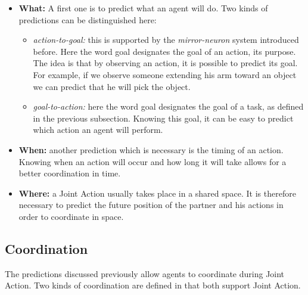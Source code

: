 \documentclass[english,a4paper,11pt,twoside]{StyleThese}
\begin{document}
\begin{itemize}
\item \textbf{What:} A first one is to predict what an agent will do. Two kinds of predictions can be distinguished here:
\begin{itemize}
\item \textit{action-to-goal:} this is supported by the \textit{mirror-neuron} system introduced before. Here the word goal designates the goal of an action, its purpose. The idea is that by observing an action, it is possible to predict its goal. For example, if we observe someone extending his arm toward an object we can predict that he will pick the object.
\item \textit{goal-to-action:} here the word goal designates the goal of a task, as defined in the previous subsection. Knowing this goal, it can be easy to predict which action an agent will perform.
\end{itemize}
\item \textbf{When:} another prediction which is necessary is the timing of an action. Knowing when an action will occur and how long it will take allows for a better coordination in time.
\item \textbf{Where:} a Joint Action usually takes place in a shared space. It is therefore necessary to predict the future position of the partner and his actions in order to coordinate in space.
\end{itemize} 


\subsection{Coordination}

\label{subsec:coordination}

The predictions discussed previously allow agents to coordinate during Joint Action. Two kinds of coordination are defined in \cite{knoblich20113} that both support Joint Action.
\end{document}
